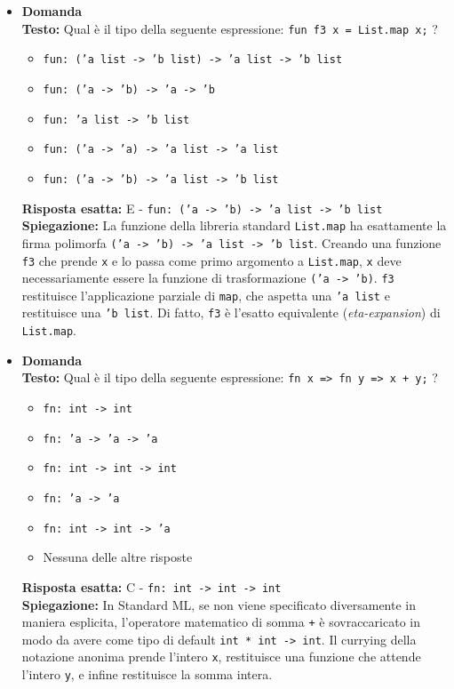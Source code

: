 \documentclass[12pt, a4paper]{article}
\newcounter{domandateoria}
\begin{document}
\begin{itemize}
    \item {}\textbf{Domanda \thedomandateoria} \\
    \textbf{Testo:} Qual è il tipo della seguente espressione: \texttt{fun f3 x = List.map x;} ?
    \begin{itemize}
        \item[A)] \texttt{fun: ('a list -> 'b list) -> 'a list -> 'b list}
        \item[B)] \texttt{fun: ('a -> 'b) -> 'a -> 'b}
        \item[C)] \texttt{fun: 'a list -> 'b list}
        \item[D)] \texttt{fun: ('a -> 'a) -> 'a list -> 'a list}
        \item[E)] \texttt{fun: ('a -> 'b) -> 'a list -> 'b list}
    \end{itemize}
    \textbf{Risposta esatta:} E - \texttt{fun: ('a -> 'b) -> 'a list -> 'b list} \\
    \textbf{Spiegazione:} La funzione della libreria standard \texttt{List.map} ha esattamente la firma polimorfa \texttt{('a -> 'b) -> 'a list -> 'b list}. Creando una funzione \texttt{f3} che prende \texttt{x} e lo passa come primo argomento a \texttt{List.map}, \texttt{x} deve necessariamente essere la funzione di trasformazione \texttt{('a -> 'b)}. \texttt{f3} restituisce l'applicazione parziale di \texttt{map}, che aspetta una \texttt{'a list} e restituisce una \texttt{'b list}. Di fatto, \texttt{f3} è l'esatto equivalente (\textit{eta-expansion}) di \texttt{List.map}.
    \vspace{0.3cm}

    \item {}\textbf{Domanda \thedomandateoria} \\
    \textbf{Testo:} Qual è il tipo della seguente espressione: \texttt{fn x => fn y => x + y;} ?
    \begin{itemize}
        \item[A)] \texttt{fn: int -> int}
        \item[B)] \texttt{fn: 'a -> 'a -> 'a}
        \item[C)] \texttt{fn: int -> int -> int}
        \item[D)] \texttt{fn: 'a -> 'a}
        \item[E)] \texttt{fn: int -> int -> 'a}
        \item[F)] Nessuna delle altre risposte
    \end{itemize}
    \textbf{Risposta esatta:} C - \texttt{fn: int -> int -> int} \\
    \textbf{Spiegazione:} In Standard ML, se non viene specificato diversamente in maniera esplicita, l'operatore matematico di somma \texttt{+} è sovraccaricato in modo da avere come tipo di default \texttt{int * int -> int}. Il currying della notazione anonima prende l'intero \texttt{x}, restituisce una funzione che attende l'intero \texttt{y}, e infine restituisce la somma intera.
    \vspace{0.3cm}


\end{itemize}
\end{document}
